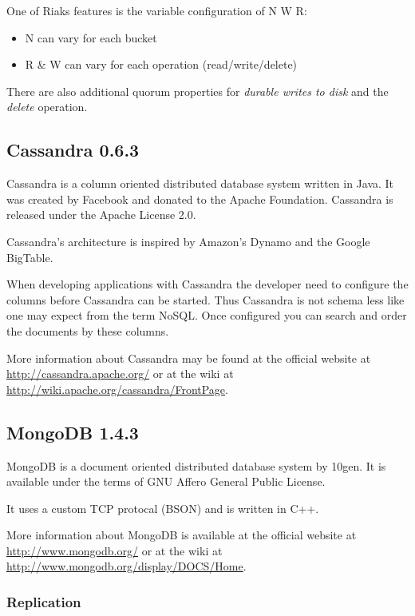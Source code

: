 One of Riaks features is the variable configuration of N W R:

\begin{itemize}
\item
  N can vary for each bucket
\item
  R \& W can vary for each operation (read/write/delete)
\end{itemize}
There are also additional quorum properties for 
\emph{durable writes to disk} and the \emph{delete} operation.


\subsection{Cassandra 0.6.3}

Cassandra is a column oriented distributed database system written
in Java. It was created by Facebook and donated to the Apache
Foundation. Cassandra is released under the Apache License 2.0.

Cassandra's architecture is inspired by Amazon's Dynamo and the
Google BigTable.

When developing applications with Cassandra the developer need to
configure the columns before Cassandra can be started. Thus
Cassandra is not schema less like one may expect from the term
NoSQL. Once configured you can search and order the documents by
these columns.

More information about Cassandra may be found at the official
website at \url{http://cassandra.apache.org/} or at the wiki at
\url{http://wiki.apache.org/cassandra/FrontPage}.

\subsection{MongoDB 1.4.3}

MongoDB is a document oriented distributed database system by
10gen. It is available under the terms of GNU Affero General Public
License.

It uses a custom TCP protocal (BSON) and is written in C++.

More information about MongoDB is available at the official website
at \url{http://www.mongodb.org/} or at the wiki at
\url{http://www.mongodb.org/display/DOCS/Home}.

\subsubsection{Replication}

